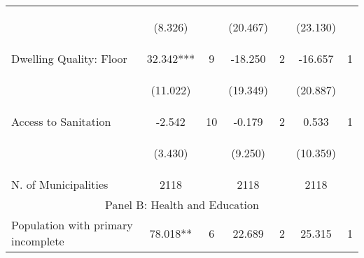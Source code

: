 \begin{tabular}{lcccccc}
\vspace{4pt} &  \begin{footnotesize}(8.326)\end{footnotesize}   & &
			    \begin{footnotesize}(20.467)\end{footnotesize}   & &
			    \begin{footnotesize}(23.130)\end{footnotesize}   &
			     \\          



Dwelling Quality: Floor   &  32.342***   &  9  &   -18.250  &  2 &  -16.657  &  1   \\

\vspace{4pt} &  \begin{footnotesize}(11.022)\end{footnotesize}   & &
			    \begin{footnotesize}(19.349)\end{footnotesize}   & &
			    \begin{footnotesize}(20.887)\end{footnotesize}   &
			     \\          

Access to Sanitation   &  -2.542   &  10  &   -0.179  &  2 &  0.533  &  1   \\

\vspace{4pt} &  \begin{footnotesize}(3.430)\end{footnotesize}   & &
			    \begin{footnotesize}(9.250)\end{footnotesize}   & &
			    \begin{footnotesize}(10.359)\end{footnotesize}   &
			     \\          

N. of Municipalities  &   2118   &  &  2118    & &  2118  &    \\

\hline		
\multicolumn{7}{c}{Panel B: Health and Education}   \\                                                          


Population with primary incomplete   &  78.018**   &  6  &   22.689  &  2 &  25.315  &  1   \\



\end{tabular}
